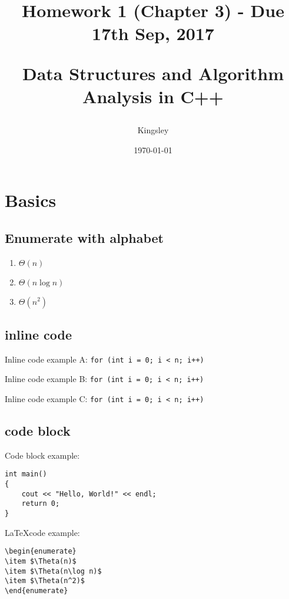 \documentclass[titlepage]{article}
\title{
Homework 1 (Chapter 3) - Due 17th Sep, 2017\\
\begin{large}
Data Structures and Algorithm Analysis in C++
\end{large}
}
\author{Kingsley}
\date{\today}
\begin{document}
\maketitle

\clearpage
\tableofcontents
\clearpage

\section{Basics}
\subsection{Enumerate with alphabet}
\begin{enumerate}[label=(\alph*)]
\item $\Theta(n)$
\item $\Theta(n\log n)$
\item $\Theta(n^2)$
\end{enumerate}

\subsection{inline code}
Inline code example A: \lstinline{for (int i = 0; i < n; i++)}

Inline code example B: \lstinline{for (int i = 0; i < n; i++)}

Inline code example C: \texttt{for (int i = 0; i < n; i++)}\\

\subsection{code block}
Code block example:

\begin{lstlisting}
int main()
{
	cout << "Hello, World!" << endl;
	return 0;
}
\end{lstlisting}

\LaTeX code example:
\begin{verbatim}
\begin{enumerate}
\item $\Theta(n)$
\item $\Theta(n\log n)$
\item $\Theta(n^2)$
\end{enumerate}
\end{verbatim}
\end{document}
